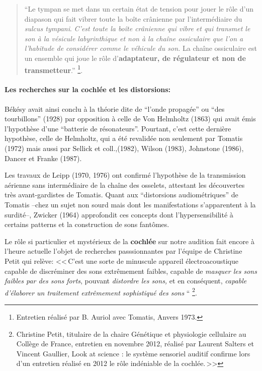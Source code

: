 \begin{quotation}
	``Le tympan se met dans un certain état de tension pour jouer le
	rôle d'un diapason qui fait vibrer toute la boîte crânienne
	par l'intermédiaire du \emph{sulcus tympani}. 
	\emph{C'est toute la boîte crânienne qui vibre et qui transmet le son à 
la vésicule labyrinthique et non à la chaîne ossiculaire que l'on a l'habitude 
de considérer comme le véhicule du son.} La chaîne ossiculaire est un ensemble 
qui
	joue le rôle d'\textbf{adaptateur, de régulateur et non de transmetteur}.'' 
	\footnote{Entretien réalisé par B. Auriol avec Tomatis, Anvers 
1973.}.
\end{quotation}

\paragraph{Les recherches sur la cochlée et les distorsions:}
Békésy avait ainsi conclu à la théorie dite de ``l'onde propagée'' ou ``des
tourbillons'' (1928) par opposition à celle de Von
Helmholtz (1863) qui avait émis l'hypothèse d'une ``batterie de
résonateurs''.  \autocite[p 24---28, ch . 1]{auriol:cle} Pourtant, c'est cette dernière hypothèse, celle de
Helmholtz, qui a été revalidée non seulement par Tomatis (1972) mais
aussi par Sellick et coll.,(1982), Wilson (1983),
  Johnstone (1986), Dancer et
  Franke (1987).

  Les travaux de Leipp (1970, 1976) ont confirmé l'hypothèse de la transmission aérienne
sans intermédiaire de la chaîne des osselets,
attestant les
découvertes très avant-gardistes de Tomatis.
Quant aux ``distorsions audiométriques'' de Tomatis \autocite[p 85]{auriol:cle}--chez un sujet non sourd mais
dont les manifestations s'apparentent à la surdité--, Zwicker (1964)
approfondit ces concepts dont  l'hypersensibilité à certains patterns et
la construction de sons fantômes.  \autocite[p 84]{auriol:cle}

 Le rôle si particulier et mystérieux de la \textbf{cochlée} sur notre audition fait encore à l'heure
actuelle l'objet de recherches passsionnantes 
par l'équipe de Christine Petit qui relève:
<<\,C'est une sorte de minuscule appareil électroacoustique capable
de discréminer des sons extrêmement faibles, capable de \emph{masquer
les sons faibles par des sons forts}, pouvant \emph{distordre les
sons,} et en conséquent, \emph{capable d'élaborer un traitement extrêmement
sophistiqué des sons} ``%
\footnote{Christine Petit, titulaire de la chaire Génétique et
physiologie cellulaire au Collège de France, entretien en novembre 2012, 
réalisé par Laurent Salters et Vincent Gaullier, 
Look at science : le système sensoriel auditif confirme 
lors d'un entretien réalisé en 2012 le rôle indéniable de la cochlée.\,>>}.

